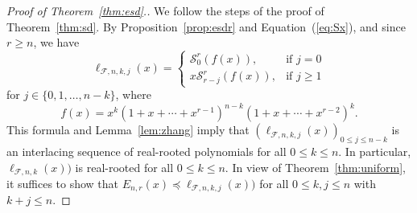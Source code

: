 \documentclass[11pt]{amsart}
\newcommand{\fF}{{\mathcal F}}
\newcommand{\sS}{{\mathcal S}}
\begin{document}
\begin{proof}[Proof of Theorem~\ref{thm:esd}.]
We follow the steps of the proof of 
Theorem~\ref{thm:sd}. By 
Proposition~\ref{prop:esdr} and 
Equation~(\ref{eq:Sx}), and since $r \ge n$, we have 
%
\[ \ell_{\fF,n,k,j}(x) = \begin{cases}
  \sS^r_0 (f(x)), & \text{if $j = 0$} \\
  x \sS^r_{r-j} (f(x)), & \text{if $j \ge 1$} 
\end{cases} \]
%
for $j \in \{0, 1,\dots,n-k\}$, where 
%
\[ f(x) = x^k (1 + x + \cdots + x^{r-1})^{n-k} 
   (1 + x + \cdots + x^{r-2})^k. \]
%
This formula and Lemma~\ref{lem:zhang} imply 
that $(\ell_{\fF,n,k,j}(x))_{0 \le j \le n-k}$ 
is an interlacing sequence of real-rooted 
polynomials for all $0 \le k \le n$. In 
particular, $\ell_{\fF,n,k}(x))$ is real-rooted 
for all $0 \le k \le n$. In view of 
Theorem~\ref{thm:uniform}, it suffices to show
that $E_{n,r}(x) \preceq \ell_{\fF,n,k,j}(x))$ 
for all $0 \le k, j \le n$ with $k+j \le n$.


\end{proof}
\end{document}
